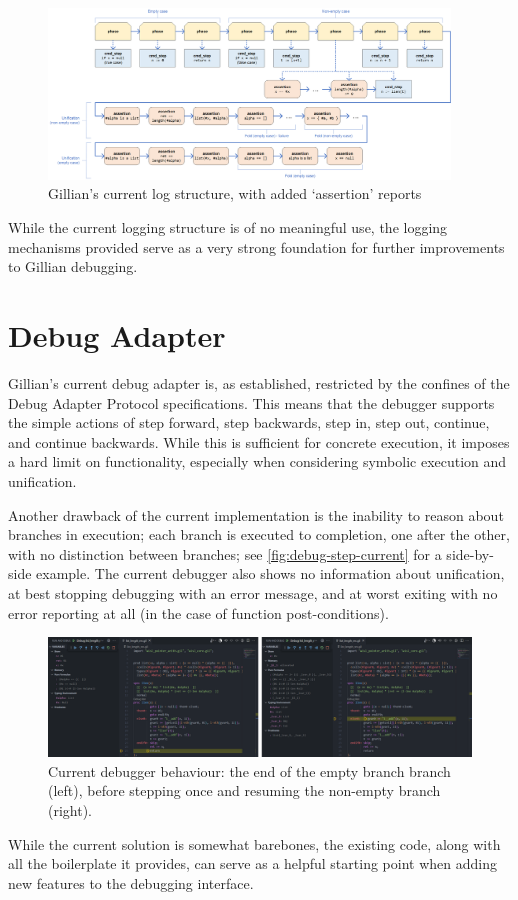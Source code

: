 \begin{figure}
  \center{}
  \includegraphics[width=0.95\textwidth]{img/log-structure-current.png}
  \caption{Gillian's current log structure, with added `assertion' reports}%
  \label{fig:log-structure-current}
\end{figure}

While the current logging structure is of no meaningful use, the logging
mechanisms provided serve as a very strong foundation for further improvements
to Gillian debugging.


\section{Debug Adapter}\label{sec:current:dap}

Gillian's current debug adapter is, as established, restricted by the confines
of the Debug Adapter Protocol specifications. This means that the debugger
supports the simple actions of step forward, step backwards, step in, step out,
continue, and continue backwards. While this is sufficient for concrete
execution, it imposes a hard limit on functionality, especially when considering
symbolic execution and unification.

Another drawback of the current implementation is the inability to reason
about branches in execution; each branch is executed to completion, one after
the other, with no distinction between branches; see
\autoref{fig:debug-step-current} for a side-by-side example. The current
debugger also shows no information about unification, at best stopping debugging
with an error message, and at worst exiting with no error reporting at all (in
the case of function post-conditions).

\begin{figure}
  \center{}
  \includegraphics[width=\textwidth]{img/debug-step-current.png}
  \caption{
    Current debugger behaviour: the end of the empty branch branch (left),
    before stepping once and resuming the non-empty branch (right).}%
  \label{fig:debug-step-current}
\end{figure}

While the current solution is somewhat barebones, the existing code, along with
all the boilerplate it provides, can serve as a helpful starting point when
adding new features to the debugging interface.
